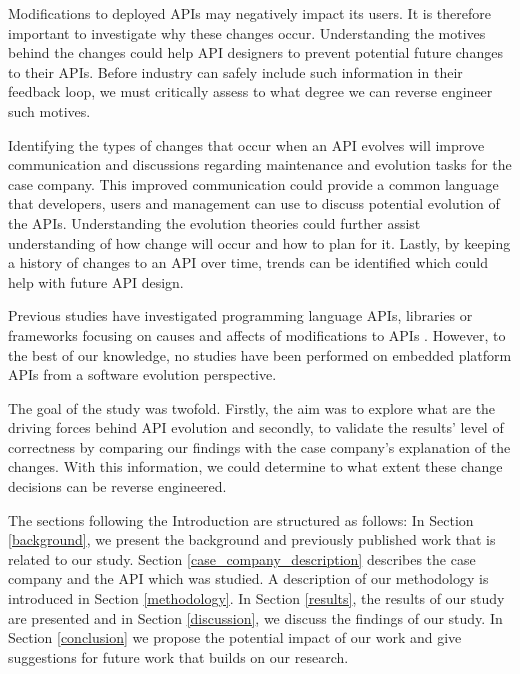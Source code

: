 \documentclass{sig-alternate}
\begin{document}
Modifications to deployed APIs may negatively impact its users. It is therefore important to investigate why these changes occur. Understanding the motives behind the changes could help API designers to  prevent potential future changes to their APIs. Before industry can safely include such information in their feedback loop, we must critically assess to what degree we can reverse engineer such motives. 

Identifying the types of changes that occur when an API evolves will improve communication and discussions regarding maintenance and evolution tasks for the case company. This improved communication could provide a common language that developers, users and management can use to discuss potential evolution of the APIs. Understanding the evolution theories could further assist understanding of how change will occur and how to plan for it. Lastly, by keeping a history of changes to an API over time, trends can be identified which could help with future API design.

Previous studies have investigated programming language APIs, libraries or frameworks focusing on causes and affects of modifications to APIs \cite{dig2005role, hou2011exploring, shi2011empirical}. However, to the best of our knowledge, no studies have been performed on embedded platform APIs from a software evolution perspective. 

The goal of the study was twofold. Firstly, the aim was to explore what are the driving forces behind API evolution and secondly, to validate the results' level of correctness by comparing our findings with the case company's explanation of the changes. With this information, we could determine to what extent these change decisions can be reverse engineered. 




The sections following the Introduction are structured as follows: In Section \ref{background}, we present the background and previously published work that is related to our study. Section \ref{case_company_description} describes the case company and the API which was studied. A description of our methodology is introduced in Section \ref{methodology}. In Section \ref{results}, the results of our study are presented and in Section \ref{discussion}, we discuss the findings of our study. In Section \ref{conclusion} we propose the potential impact of our work and give suggestions for future work that builds on our research. 
\end{document}
